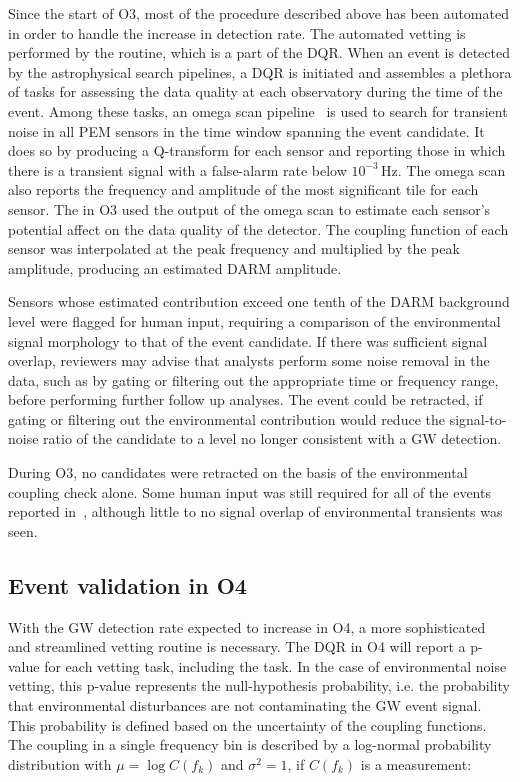 Since the start of \ac{O3}, most of the procedure described above has been automated in order to handle the increase in detection rate.
The automated vetting is performed by the  routine, which is a part of the \ac{DQR}.
When an event is detected by the astrophysical search pipelines, a \ac{DQR} is initiated and assembles a plethora of tasks for assessing the data quality at each observatory during the time of the event.
Among these tasks, an omega scan pipeline~\citep{Davis_2021, Chatterji_2004} is used to search for transient noise in all \ac{PEM} sensors in the time window spanning the event candidate.
It does so by producing a Q-transform for each sensor and reporting those in which there is a transient signal with a false-alarm rate below $10^{-3}$\,Hz.
The omega scan also reports the frequency and amplitude of the most significant tile for each sensor.
The  in \ac{O3} used the output of the omega scan to estimate each sensor's potential affect on the data quality of the detector.
The coupling function of each sensor was interpolated at the peak frequency and multiplied by the peak amplitude, producing an estimated \ac{DARM} amplitude.

Sensors whose estimated contribution exceed one tenth of the \ac{DARM} background level were flagged for human input, requiring a comparison of the environmental signal morphology to that of the event candidate.
If there was sufficient signal overlap, reviewers may advise that analysts perform some noise removal in the data, such as by gating or filtering out the appropriate time or frequency range, before performing further follow up analyses.
The event could be retracted, if gating or filtering out the environmental contribution would reduce the signal-to-noise ratio of the candidate to a level no longer consistent with a GW detection.

During \ac{O3}, no candidates were retracted on the basis of the environmental coupling check alone.
Some human input was still required for all of the \XX events reported in~\citep{gwtc2}, although little to no signal overlap of environmental transients was seen.

\subsection{Event validation in O4}

With the \ac{GW} detection rate expected to increase in \ac{O4}, a more sophisticated and streamlined vetting routine is necessary.
The \ac{DQR} in \ac{O4} will report a p-value for each vetting task, including the  task.
In the case of environmental noise vetting, this p-value represents the null-hypothesis probability, i.e. the probability that environmental disturbances are not contaminating the \ac{GW} event signal.
This probability is defined based on the uncertainty of the coupling functions.
The coupling in a single frequency bin is described by a log-normal probability distribution with $\mu=\log{C(f_k)}$ and $\sigma^2=1$, if $C(f_k)$ is a measurement:

